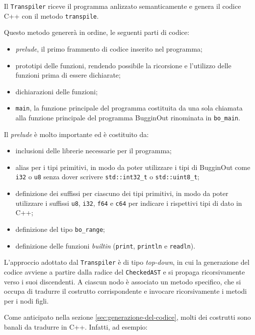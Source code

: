 Il \texttt{Transpiler} riceve il programma anlizzato semanticamente e genera il codice C++ con il metodo \texttt{transpile}.

Questo metodo generer\`a in ordine, le seguenti parti di codice:
\begin{itemize}
	\item \emph{prelude}, il primo frammento di codice inserito nel programma;
	\item prototipi delle funzioni, rendendo possibile la ricorsione e l'utilizzo delle funzioni prima di essere dichiarate;
	\item dichiarazioni delle funzioni;
	\item \texttt{main}, la funzione principale del programma costituita da una sola chiamata alla funzione principale del programma BugginOut rinominata in \texttt{bo\_main}.
\end{itemize}

Il \textit{prelude} \`e molto importante ed \`e costituito da:
\begin{itemize}
	\item inclusioni delle librerie necessarie per il programma;
	\item alias per i tipi primitivi, in modo da poter utilizzare i tipi di BugginOut come \texttt{i32} o \texttt{u8} senza dover scrivere \texttt{std::int32\_t} o \texttt{std::uint8\_t};
	\item definizione dei suffissi per ciascuno dei tipi primitivi, in modo da poter utilizzare i suffissi \texttt{u8}, \texttt{i32}, \texttt{f64} e \texttt{c64} per indicare i rispettivi tipi di dato in C++;
	\item definizione del tipo \texttt{bo\_range};
	\item definizione delle funzioni \textit{builtin} (\texttt{print}, \texttt{println} e \texttt{readln}).
\end{itemize}

L'approccio adottato dal \texttt{Transpiler} è di tipo \textit{top-down}, in cui la generazione del codice avviene a partire dalla radice del \texttt{CheckedAST} e si propaga ricorsivamente verso i suoi discendenti. A ciascun nodo è associato un metodo specifico, che si occupa di tradurre il costrutto corrispondente e invocare ricorsivamente i metodi per i nodi figli.

Come anticipato nella sezione \ref{sec:generazione-del-codice}, molti dei costrutti sono banali da tradurre in C++. Infatti, ad esempio:


